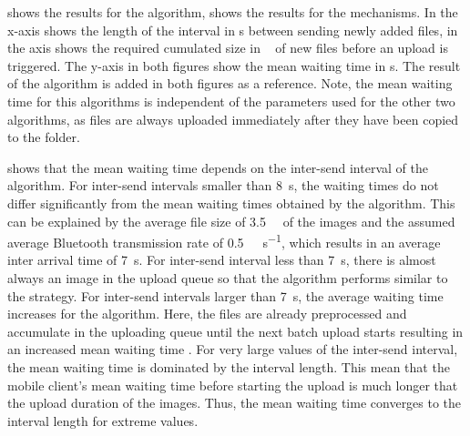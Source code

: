  shows the results for the \algointerval algorithm,  shows the results for the \algosize mechanisms. 
In  the x-axis shows the length of the interval in \si{\second} between sending newly added files, in  the axis shows the required cumulated size in \si{\mega\byte} of new files before an upload is triggered.
The y-axis in both figures show the mean waiting time \sojournTime in \si{\second}.
The result of the \algoimmediate algorithm is added in both figures as a reference.
Note, the mean waiting time \sojournTime for this algorithms is independent of the parameters used for the other two algorithms, as files are always uploaded immediately after they have been copied to the \dropbox folder.

 shows that the mean waiting time \sojournTime depends on the inter-send interval of the \algointerval algorithm. 
For inter-send intervals smaller than \SI{8}{\second}, the waiting times do not differ significantly from the mean waiting times \sojournTime obtained by the \algoimmediate algorithm.
This can be explained by the average file size of \SI{3.5}{\mega\byte} of the images and the assumed average Bluetooth transmission rate of \SI{0.5}{\mega\bit\per\second}, which results in an average inter arrival time of \SI{7}{\second}.
For inter-send interval less than \SI{7}{\second}, there is almost always an image in the upload queue so that the algorithm performs similar to the \algoimmediate strategy. 
For inter-send intervals larger than \SI{7}{\second}, the average waiting time increases for the \algointerval algorithm.
Here, the files are already preprocessed and accumulate in the uploading queue until the next batch upload starts resulting in an increased mean waiting time \sojournTime.
For very large values of the inter-send interval, the mean waiting time \sojournTime is dominated by the interval length.
This mean that the mobile client's mean waiting time \sojournTime before starting the upload is much longer that the upload duration of the images.
Thus, the mean waiting time \sojournTime converges to the interval length for extreme values.

